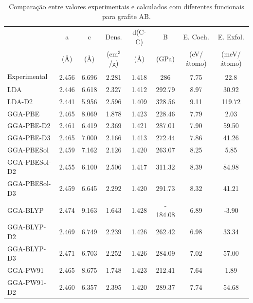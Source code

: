 		\begin{table}[]
			\centering
			\caption{Comparação entre valores experimentais e calculados com diferentes funcionais para grafite AB.}
			\label{grafite_AB}
			\renewcommand{\arraystretch}{1.2}
			\tiny\selectfont
			\begin{tabular}{l|ccccccc}
				\hline\hline
							  & a     & c     & Dens. & d(C-C) & B & E. Coeh. & E. Exfol. \\
				 			  & (Å) & (Å) & (cm$^3$/g) & (Å) & (GPa) & (eV/átomo) & (meV/átomo)\\ \hline
				Experimental  & 2.456\textsuperscript{\cite{wyckoff1963crystal}} & 6.696\textsuperscript{\cite{wyckoff1963crystal}} &   2.281\textsuperscript{\cite{wyckoff1963crystal}}       &      1.418\textsuperscript{\cite{wyckoff1963crystal}}        & 286\textsuperscript{\cite{furthmuller1994ab}} &     7.75\textsuperscript{\cite{greenwood2012chemistry}}            &     22.8\textsuperscript{\cite{benedict1998microscopic}}      \\
				LDA           & 2.446 & 6.618 &   2.327       &      1.412        & 292.79  &     8.97           &    30.92      \\
				LDA-D2        & 2.441 & 5.956 &   2.596       &      1.409        & 328.56  &     9.11           &   119.72      \\
				GGA-PBE       & 2.465 & 8.069 &   1.878       &      1.423        & 228.46  &     7.79           &     2.03      \\
				GGA-PBE-D2    & 2.461 & 6.419 &   2.369       &      1.421        & 287.01  &     7.90           &    59.50      \\
				GGA-PBE-D3    & 2.465 & 7.000 &   2.166       &      1.413        & 272.44  &     7.86           &    41.26      \\
				GGA-PBESol    & 2.459 & 7.162 &   2.126       &      1.420        & 263.07  &     8.25           &     5.85      \\
				GGA-PBESol-D2 & 2.455 & 6.100 &   2.506       &      1.417        & 311.32  &     8.39           &    84.98      \\
				GGA-PBESol-D3 & 2.459 & 6.645 &   2.292       &      1.420        & 291.73  &     8.32           &    41.21      \\
				GGA-BLYP      & 2.474 & 9.163 &   1.643       &      1.428        &- 184.08  &     6.89           &    -3.90      \\
				GGA-BLYP-D2   & 2.469 & 6.749 &   2.239       &      1.426        & 262.42  &     6.98           &    33.34      \\
				GGA-BLYP-D3   & 2.471 & 6.703 &   2.252       &      1.426        & 284.09  &     7.02           &    57.00      \\
				GGA-PW91      & 2.465 & 8.675 &   1.748       &      1.423        & 212.41  &     7.64           &     1.89      \\
				GGA-PW91-D2   & 2.460 & 6.357 &   2.395       &      1.420        & 289.37  &     7.74           &    54.68      \\ \hline\hline           
			\end{tabular}
		\end{table}

